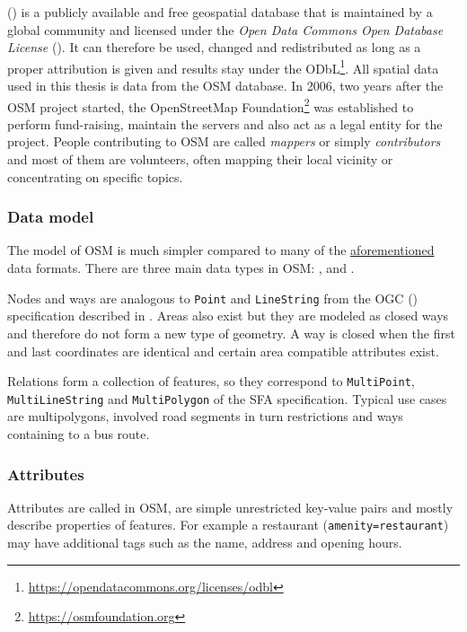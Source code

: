 		 () is a publicly available and free geospatial database that is maintained by a global community and licensed under the \emph{Open Data Commons Open Database License} ()\cite{osm-wiki-about}.
		It can therefore be used, changed and redistributed as long as a proper attribution is given and results stay under the ODbL\footnote{\url{https://opendatacommons.org/licenses/odbl}}.
		All spatial data used in this thesis is data from the OSM database.
		In 2006, two years after the OSM project started, the OpenStreetMap Foundation\footnote{\url{https://osmfoundation.org}} was established to perform fund-raising, maintain the servers and also act as a legal entity for the project.
		People contributing to OSM are called \textit{mappers} or simply \textit{contributors} and most of them are volunteers, often mapping their local vicinity or concentrating on specific topics.
		
		\subsubsection{Data model}
		
			The model of OSM is much simpler compared to many of the \hyperref[subsec:file-formats]{aforementioned} data formats.
			There are three main data types in OSM: ,  and \cite{osm-wiki-data-model}.
			
			Nodes and ways are analogous to \texttt{Point} and \texttt{LineString} from the OGC  () specification described in .
			Areas also exist but they are modeled as closed ways and therefore do not form a new type of geometry.
			A way is closed when the first and last coordinates are identical and certain area compatible attributes exist.
			
			Relations form a collection of features, so they correspond to \texttt{MultiPoint}, \texttt{MultiLineString} and \texttt{MultiPolygon} of the SFA specification.
			Typical use cases are multipolygons, involved road segments in turn restrictions and ways containing to a bus route.
			
		\subsubsection{Attributes}
		\label{subsubsec:osm-attributes}
			
			Attributes are called  in OSM, are simple unrestricted key-value pairs and mostly describe properties of features.
			For example a restaurant (\texttt{amenity=restaurant}) may have additional tags such as the name, address and opening hours.
			
